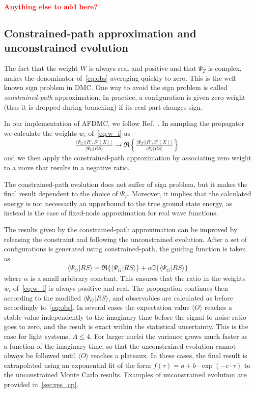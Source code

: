 \documentclass[aps,prc,twocolumn,superscriptaddress,floatfix]{revtex4-1}
\newcommand{\red}[1]{\protect\textcolor{red}{#1}}
\begin{document}
\red{\bf Anything else to add here?}



\subsection{Constrained-path approximation and unconstrained evolution}
\label{sec:cp}
The fact that the weight $W$ is always real and positive and that $\Psi_T$ is complex, 
makes the denominator of~\cref{eq:obs} averaging quickly to zero. 
This is the well known sign problem in DMC.
One way to avoid the sign problem is called \emph{constrained-path} approximation. In practice,
a configuration is given zero weight (thus it is dropped during branching) 
if its real part changes sign.

In our implementation of AFDMC, we follow Ref.~\cite{Zhang:2003}. 
In sampling the propagator we calculate the weights $w_i$ of~\cref{eq:w_i} as
\begin{align}
\frac{\langle\Psi_G|(R',S'(X)\rangle}{\langle\Psi_G|RS\rangle}\rightarrow
\Re\left\{\frac{\langle\Psi_T|(R',S'(X)\rangle}{\langle\Psi_T|RS\rangle}\right\}\,
\end{align}
and we then apply the constrained-path approximation by associating zero weight to a move
that results in a negative ratio.

The constrained-path evolution does not suffer of sign problem, but it makes the final result
dependent to the choice of $\Psi_T$. Moreover, it implies that the calculated energy is not necessarily
an upperbound to the true ground state energy, as instead is the case of fixed-node approximation 
for real wave functions.

The results given by the constrained-path approximation can be improved by releasing the 
constraint and following the unconstrained evolution.
After a set of configurations is generated using constrained-path, the guiding function
is taken as
\begin{align}
\langle\Psi_G|RS\rangle=\Re\{\langle\Psi_G|RS\rangle\}+\alpha\Im\{\langle\Psi_G|RS\rangle\}
\end{align}
where $\alpha$ is a small arbitrary constant.
This ensures that the ratio in the weights $w_i$ of~\cref{eq:w_i} is always positive and real.
The propagation continues then according to the modified $\langle\Psi_G|RS\rangle$, and 
observables are calculated as before accordingly to~\cref{eq:obs}.
In several cases the expectation value $\langle O\rangle$ reaches a stable value independently
to the imaginary time before the signal-to-noise ratio goes to zero, and the result is exact 
within the statistical uncertainty.
This is the case for light systems, $A\le4$. For larger nuclei the variance grows much faster 
as a function of the imaginary time, so that the unconstrained evolution cannot always be 
followed until $\langle O\rangle$ reaches a plateaux. In these cases, the final result is
extrapolated using an exponential fit of the form $f(\tau)=a+b\cdot\exp(-c\cdot\tau)$ to the unconstrained
Monte Carlo results. Examples of unconstrained evolution are provided in~\cref{sec:res_cp}.
\end{document}
